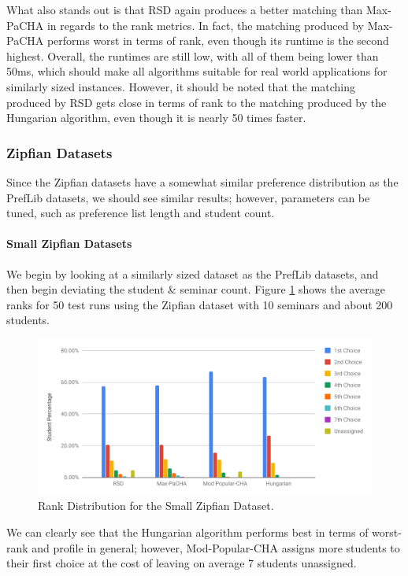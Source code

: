 What also stands out is that RSD again produces a better matching than Max-PaCHA in regards to the rank metrics. In fact, the matching produced by Max-PaCHA performs worst in terms of rank, even though its runtime is the second highest. Overall, the runtimes are still low, with all of them being lower than 50ms, which should make all algorithms suitable for real world applications for similarly sized instances. However, it should be noted that the matching produced by RSD gets close in terms of rank to the matching produced by the Hungarian algorithm, even though it is nearly 50 times faster.

\subsubsection{Zipfian Datasets}
Since the Zipfian datasets have a somewhat similar preference distribution as the PrefLib datasets, we should see similar results; however, parameters can be tuned, such as preference list length and student count.

\paragraph{Small Zipfian Datasets}
We begin by looking at a similarly sized dataset as the PrefLib datasets, and then begin deviating the student \& seminar count. Figure \ref{fig:zipfian-small-distribution} shows the average ranks for 50 test runs using the Zipfian dataset with 10 seminars and about 200 students. 

\begin{figure}[h!]
  \centering
    \includegraphics[width=0.8\linewidth]{assets/plots/small-zipfian-cropped.pdf}
    \caption{Rank Distribution for the Small Zipfian Dataset.}
    \label{fig:zipfian-small-distribution}
\end{figure}

We can clearly see that the Hungarian algorithm performs best in terms of worst-rank and profile in general; however, Mod-Popular-CHA assigns more students to their first choice at the cost of leaving on average 7 students unassigned.

